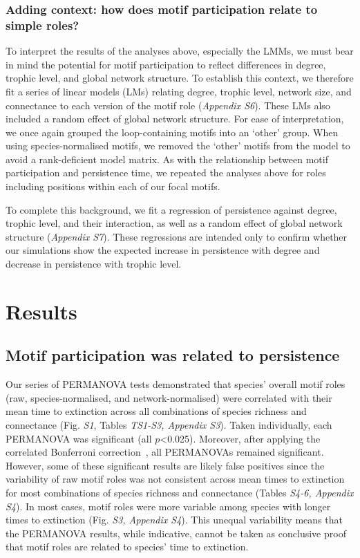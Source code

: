 \documentclass[12pt]{article}
\begin{document}
\begin{spacing}{2.0}
        \subsubsection*{Adding context: how does motif participation relate to simple roles?}

            To interpret the results of the analyses above, especially the LMMs, we must bear in mind the potential for motif participation to reflect differences in degree, trophic level, and global network structure. 
            To establish this context, we therefore fit a series of linear models (LMs) relating degree, trophic level, network size, and connectance to each version of the motif role (\emph{Appendix S6}). 
            These LMs also included a random effect of global network structure.
            For ease of interpretation, we once again grouped the loop-containing motifs into an `other' group. 
            When using species-normalised motifs, we removed the `other' motifs from the model to avoid a rank-deficient model matrix.
            As with the relationship between motif participation and persistence time, we repeated the analyses above for roles including positions within each of our focal motifs.
            
            
            To complete this background, we fit a regression of persistence against degree, trophic level, and their interaction, as well as a random effect of global network structure (\emph{Appendix S7}). 
            These regressions are intended only to confirm whether our simulations show the expected increase in persistence with degree and decrease in persistence with trophic level. 


\section*{Results}
	
    \subsection*{Motif participation was related to persistence}
    
		Our series of PERMANOVA tests demonstrated that species' overall motif roles (raw, species-normalised, and network-normalised) were correlated with their mean time to extinction across all combinations of species richness and connectance (Fig. \emph{S1}, Tables \emph{TS1-S3, Appendix S3}). 
        Taken individually, each PERMANOVA was significant (all $p$\textless0.025). Moreover, after applying the correlated Bonferroni correction~\citep{Drezner2016}, all PERMANOVAs remained significant.
		However, some of these significant results are likely false positives since the variability of raw motif roles was not consistent across mean times to extinction for most combinations of species richness and connectance (Tables \emph{S4-6, Appendix S4}). 
        In most cases, motif roles were more variable among species with longer times to extinction (Fig. \emph{S3, Appendix S4}).
        This unequal variability means that the PERMANOVA results, while indicative, cannot be taken as conclusive proof that motif roles are related to species' time to extinction.
    


\end{spacing}
\end{document}
